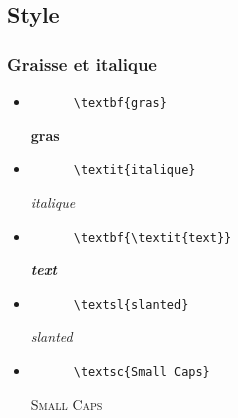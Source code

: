 \documentclass[a4paper,12pt]{article}
\begin{document}
\subsection{Style}
\subsubsection{Graisse et italique}
\begin{itemize}
  \renewcommand\labelitemi{}
  \item
  \begin{minipage}[t]{.46\linewidth}
    \begin{verbatim}
      \textbf{gras}
    \end{verbatim}
  \end{minipage} \hfill
  \begin{minipage}[t]{.46\linewidth}
    \textbf{gras}
  \end{minipage}
  \item
  \begin{minipage}[t]{.46\linewidth}
    \begin{verbatim}
      \textit{italique}
    \end{verbatim}
  \end{minipage} \hfill
  \begin{minipage}[t]{.46\linewidth}
    \textit{italique}
  \end{minipage}
  \item
  \begin{minipage}[t]{.46\linewidth}
    \begin{verbatim}
      \textbf{\textit{text}}
    \end{verbatim}
  \end{minipage} \hfill
  \begin{minipage}[t]{.46\linewidth}
    \textbf{\textit{text}}
  \end{minipage}
  \item
  \begin{minipage}[t]{.46\linewidth}
    \begin{verbatim}
      \textsl{slanted}
    \end{verbatim}
  \end{minipage} \hfill
  \begin{minipage}[t]{.46\linewidth}
    \textsl{slanted}
  \end{minipage}
  \item
  \begin{minipage}[t]{.46\linewidth}
    \begin{verbatim}
      \textsc{Small Caps}
    \end{verbatim}
  \end{minipage} \hfill
  \begin{minipage}[t]{.46\linewidth}
    \textsc{Small Caps}
  \end{minipage}
\end{itemize}

%
\end{document}
